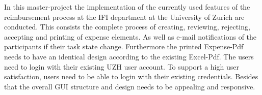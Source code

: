 In this master-project the implementation of the currently used features of the reimbursement process at the IFI department at the University of Zurich are conducted. This consists the complete process of creating, reviewing, rejecting, accepting and printing of expense elements. As well as e-mail notifications of the participants if their task state change. Furthermore the printed Expense-Pdf needs to have an identical design according to the existing Excel-Pdf.\newline 
The users need to login with their existing UZH user account. To support a high user satisfaction, users need to be able to login with their existing credentials. Besides that the overall GUI structure and design needs to be appealing and responsive.